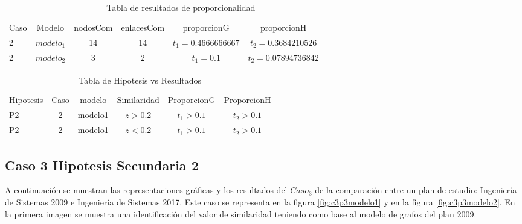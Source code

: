 \begin{table}[H]
\centering
\caption{Tabla de resultados de proporcionalidad}
\begin{tabular}[t]{lccccccccc}
\hline
Caso & Modelo & nodosCom & enlacesCom & proporcionG &proporcionH \\
2 & $modelo_1$ & 14 & 14 & $t_1=0.4666666667$ & $t_2=0.3684210526$ \\
2 & $modelo_2$ & 3 & 2 & $t_1=0.1 $ & $t_2=0.07894736842$ \\
\hline
\end{tabular}
\label{tab:tabresultados2_C2_P2}
\end{table}

\begin{table}[H]
\centering
\caption{Tabla de Hipotesis vs Resultados }
\begin{tabular}[t]{lccccc}
\hline
Hipotesis & Caso & modelo & Similaridad & ProporcionG & ProporcionH\\
P2 & 2 & modelo1 & $z>0.2$ & $t_1>0.1$ & $t_2>0.1$\\
P2 & 2 & modelo1 & $z<0.2$ & $t_1>0.1$ & $t_2>0.1$\\
\hline
\end{tabular}
\label{tab:hipotesis_C2_P2}
\end{table}

\clearpage

\subsection{Caso 3 Hipotesis Secundaria 2}

A continuación se muestran las representaciones gráficas y los resultados del $Caso_3$ de la comparación entre un plan de estudio:  Ingeniería de Sistemas 2009 e Ingeniería de Sistemas 2017. Este caso se representa en la figura \ref{fig:c3p3modelo1} y en la figura \ref{fig:c3p3modelo2}. En la primera imagen se muestra una identificación del valor de similaridad teniendo como base al modelo de grafos del plan 2009. 


